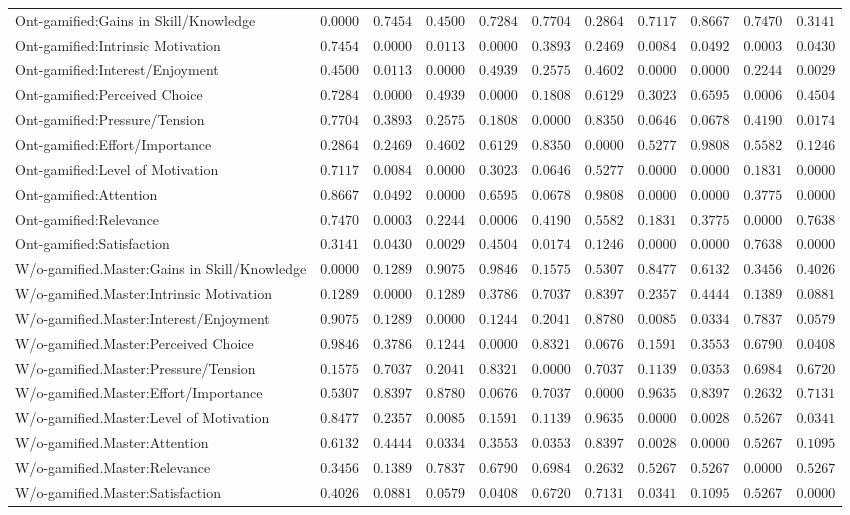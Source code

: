 \begin{landscape}
{\begin{longtable}{lrrrrrrrrrr}
Ont-gamified:Gains in Skill/Knowledge&$0.0000$&$0.7454$&$0.4500$&$0.7284$&$0.7704$&$0.2864$&$0.7117$&$0.8667$&$0.7470$&$0.3141$\tabularnewline
Ont-gamified:Intrinsic Motivation&$0.7454$&$0.0000$&$0.0113$&$0.0000$&$0.3893$&$0.2469$&$0.0084$&$0.0492$&$0.0003$&$0.0430$\tabularnewline
Ont-gamified:Interest/Enjoyment&$0.4500$&$0.0113$&$0.0000$&$0.4939$&$0.2575$&$0.4602$&$0.0000$&$0.0000$&$0.2244$&$0.0029$\tabularnewline
Ont-gamified:Perceived Choice&$0.7284$&$0.0000$&$0.4939$&$0.0000$&$0.1808$&$0.6129$&$0.3023$&$0.6595$&$0.0006$&$0.4504$\tabularnewline
Ont-gamified:Pressure/Tension&$0.7704$&$0.3893$&$0.2575$&$0.1808$&$0.0000$&$0.8350$&$0.0646$&$0.0678$&$0.4190$&$0.0174$\tabularnewline
Ont-gamified:Effort/Importance&$0.2864$&$0.2469$&$0.4602$&$0.6129$&$0.8350$&$0.0000$&$0.5277$&$0.9808$&$0.5582$&$0.1246$\tabularnewline
Ont-gamified:Level of Motivation&$0.7117$&$0.0084$&$0.0000$&$0.3023$&$0.0646$&$0.5277$&$0.0000$&$0.0000$&$0.1831$&$0.0000$\tabularnewline
Ont-gamified:Attention&$0.8667$&$0.0492$&$0.0000$&$0.6595$&$0.0678$&$0.9808$&$0.0000$&$0.0000$&$0.3775$&$0.0000$\tabularnewline
Ont-gamified:Relevance&$0.7470$&$0.0003$&$0.2244$&$0.0006$&$0.4190$&$0.5582$&$0.1831$&$0.3775$&$0.0000$&$0.7638$\tabularnewline
Ont-gamified:Satisfaction&$0.3141$&$0.0430$&$0.0029$&$0.4504$&$0.0174$&$0.1246$&$0.0000$&$0.0000$&$0.7638$&$0.0000$\tabularnewline
\hline


W/o-gamified.Master:Gains in Skill/Knowledge&$0.0000$&$0.1289$&$0.9075$&$0.9846$&$0.1575$&$0.5307$&$0.8477$&$0.6132$&$0.3456$&$0.4026$\tabularnewline
W/o-gamified.Master:Intrinsic Motivation&$0.1289$&$0.0000$&$0.1289$&$0.3786$&$0.7037$&$0.8397$&$0.2357$&$0.4444$&$0.1389$&$0.0881$\tabularnewline
W/o-gamified.Master:Interest/Enjoyment&$0.9075$&$0.1289$&$0.0000$&$0.1244$&$0.2041$&$0.8780$&$0.0085$&$0.0334$&$0.7837$&$0.0579$\tabularnewline
W/o-gamified.Master:Perceived Choice&$0.9846$&$0.3786$&$0.1244$&$0.0000$&$0.8321$&$0.0676$&$0.1591$&$0.3553$&$0.6790$&$0.0408$\tabularnewline
W/o-gamified.Master:Pressure/Tension&$0.1575$&$0.7037$&$0.2041$&$0.8321$&$0.0000$&$0.7037$&$0.1139$&$0.0353$&$0.6984$&$0.6720$\tabularnewline
W/o-gamified.Master:Effort/Importance&$0.5307$&$0.8397$&$0.8780$&$0.0676$&$0.7037$&$0.0000$&$0.9635$&$0.8397$&$0.2632$&$0.7131$\tabularnewline
W/o-gamified.Master:Level of Motivation&$0.8477$&$0.2357$&$0.0085$&$0.1591$&$0.1139$&$0.9635$&$0.0000$&$0.0028$&$0.5267$&$0.0341$\tabularnewline
W/o-gamified.Master:Attention&$0.6132$&$0.4444$&$0.0334$&$0.3553$&$0.0353$&$0.8397$&$0.0028$&$0.0000$&$0.5267$&$0.1095$\tabularnewline
W/o-gamified.Master:Relevance&$0.3456$&$0.1389$&$0.7837$&$0.6790$&$0.6984$&$0.2632$&$0.5267$&$0.5267$&$0.0000$&$0.5267$\tabularnewline
W/o-gamified.Master:Satisfaction&$0.4026$&$0.0881$&$0.0579$&$0.0408$&$0.6720$&$0.7131$&$0.0341$&$0.1095$&$0.5267$&$0.0000$\tabularnewline
\hline



\end{longtable}}
\end{landscape}
